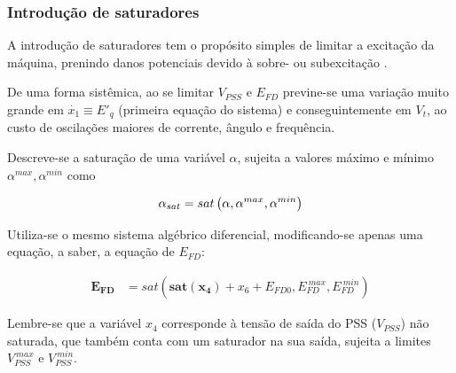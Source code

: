 \documentclass[10pt, compress,xcolor={svgnames,dvipsnames,x11names}]{beamer}
\begin{document}
\begin{frame}%
\frametitle{Introdução de saturadores}
\scriptsize

	A introdução de saturadores tem o propósito simples de limitar a excitação da máquina, prenindo danos potenciais devido à sobre- ou subexcitação \cite{kundur, ieeeStd4215}.

	De uma forma sistêmica, ao se limitar $V_{PSS}$ e $E_{FD}$ previne-se uma variação muito grande em $\dot{x_1} \equiv E'_q$ (primeira equação do sistema) e conseguintemente em $V_t$, ao custo de oscilações maiores de corrente, ângulo e frequência.

	Descreve-se a saturação de uma variável $\alpha$, sujeita a valores máximo e mínimo $\alpha^{max},\alpha^{min}$ como

\begin{gather}
	\alpha_{sat} = sat\left(\strut \alpha,\alpha^{max},\alpha^{min} \right)
\end{gather}

	Utiliza-se o mesmo sistema algébrico diferencial, modificando-se apenas uma equação, a saber, a equação de $E_{FD}$:

\begin{align}
\mathbf{E_{FD}} &= sat\left( \mathbf{sat(x_4)} + x_6 + E_{FD0} ,E_{FD}^{\ max},E_{FD}^{\ min} \right)
\end{align}

	Lembre-se que a variável $x_4$ corresponde à tensão de saída do PSS ($V_{PSS}$) não saturada, que também conta com um saturador na sua saída, sujeita a limites $V_{PSS}^{\ max}$ e $V_{PSS}^{\ min}$.

\normalsize
\end{frame}%
\end{document}
